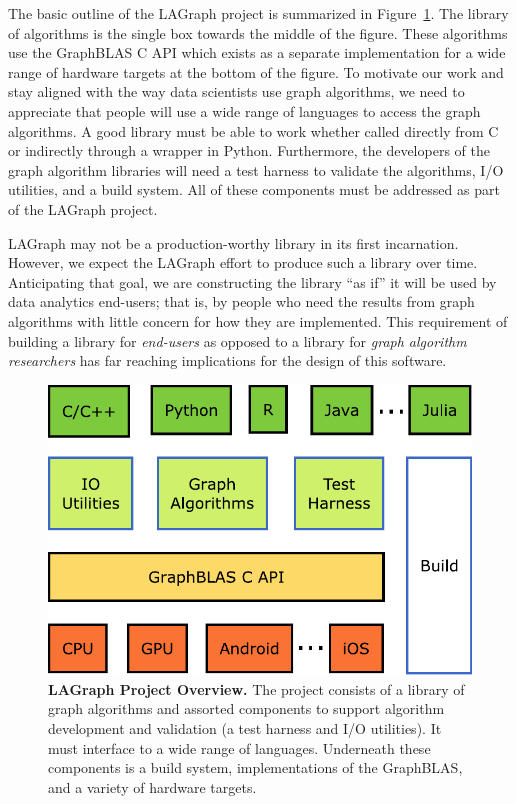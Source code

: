 The basic outline of the LAGraph project  is summarized in 
Figure~\ref{fig:overview}. The library of algorithms is the single box towards
the middle of the figure.  These algorithms use the GraphBLAS C API
which exists as a separate implementation for a wide range of hardware
targets at the bottom of the figure.  To motivate our work and stay aligned 
with the way data scientists use graph algorithms, we need to appreciate that
people will use a wide range of languages to access the graph algorithms.  A good library
must be able to work whether called directly from C or indirectly through a wrapper in Python.
Furthermore, the developers of the graph algorithm libraries will need a test harness to
validate the algorithms, I/O utilities, and a build system.  All of these components must
be addressed as part of the LAGraph project. 

LAGraph may not be a production-worthy library in its first incarnation.  
However, we expect the LAGraph effort to produce such a library over time.  
Anticipating that goal, we are constructing
the library ``as if'' it will be used by data analytics end-users; that is, by people
who need the results from graph algorithms with little concern for how they are
implemented.  This requirement of building a library for \emph{end-users} as opposed to 
a library for \emph{graph algorithm researchers} has far reaching implications for the 
design of this software.

\begin{figure}[t]
	\includegraphics[width=\linewidth]{fig/lagraph}
	\caption{\textbf{LAGraph Project Overview.} The project consists of a library of 
	graph algorithms and assorted components to support algorithm development and validation
	(a test harness and I/O utilities). It must interface to a wide range of languages.
	Underneath these components is a build system, implementations of the GraphBLAS,
	and a variety of hardware targets. \label{fig:overview}}
\end{figure}

